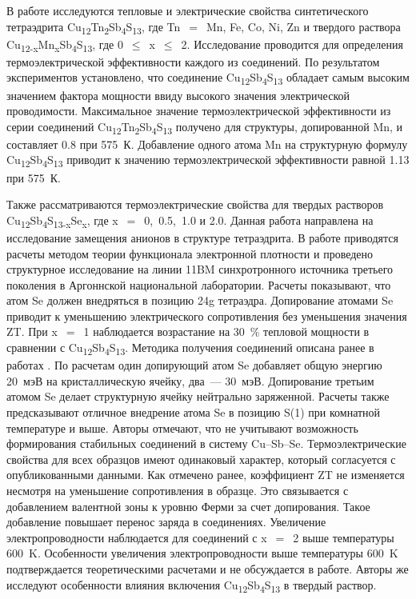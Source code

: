 В работе \cite{Heo2014} исследуются тепловые и электрические свойства синтетического тетраэдрита Cu\textsubscript{12}Tn\textsubscript{2}Sb\textsubscript{4}S\textsubscript{13}, где Tn~$=$~Mn, Fe, Co, Ni, Zn и твердого раствора Cu\textsubscript{12-x}Mn\textsubscript{x}Sb\textsubscript{4}S\textsubscript{13}, где 0~$\leq$~x~$\leq$~2. Исследование проводится для определения термоэлектрической эффективности каждого из соединений. По результатом экспериментов установлено, что соединение Cu\textsubscript{12}Sb\textsubscript{4}S\textsubscript{13} обладает самым высоким значением фактора мощности ввиду высокого значения электрической проводимости. Максимальное значение термоэлектрической эффективности из серии соединений Cu\textsubscript{12}Tn\textsubscript{2}Sb\textsubscript{4}S\textsubscript{13} получено для структуры, допированной Mn, и составляет 0.8 при 575~К. Добавление одного атома  Mn на структурную формулу Cu\textsubscript{12}Sb\textsubscript{4}S\textsubscript{13} приводит к значению термоэлектрической эффективности равной 1.13 при 575~К.

Также рассматриваются термоэлектрические свойства для твердых растворов Cu\textsubscript{12}Sb\textsubscript{4}S\textsubscript{13-x}Se\textsubscript{x}, где x~$=$~0,~0.5,~1.0 и 2.0\cite{Lu2016}.
Данная работа направлена на исследование замещения анионов в структуре тетраэдрита.
В работе приводятся расчеты методом теории функционала электронной плотности и проведено структурное исследование на линии 11BM  синхротронного источника третьего поколения в Аргоннской национальной лаборатории.
Расчеты показывают, что атом Se должен внедряться в позицию 24g тетраэдра.
Допирование атомами Se приводит к уменьшению электрического сопротивления без уменьшения значения ZT.
При x~$=$~1 наблюдается возрастание на 30~\% тепловой мощности в сравнении с Cu\textsubscript{12}Sb\textsubscript{4}S\textsubscript{13}.
Методика получения соединений описана ранее в работах \cite{Lu2013,Lu_2013b,Lu_2013}. По расчетам один допирующий атом Se  добавляет общую энергию 20~мэВ на кристаллическую ячейку, два~--- 30~мэВ.
Допирование третьим атомом Se делает структурную ячейку нейтрально заряженной. Расчеты также предсказывают отличное внедрение атома Se в позицию S(1) при комнатной температуре и выше. Авторы отмечают, что не учитывают возможность формирования стабильных соединений в систему Cu--Sb--Se.
Термоэлектрические свойства для всех образцов имеют одинаковый характер, который согласуется с опубликованными данными.
Как отмечено ранее, коэффициент ZT не изменяется несмотря на уменьшение сопротивления в образце.
Это связывается с добавлением  валентной зоны к уровню Ферми за счет допирования.
Такое добавление повышает перенос заряда в соединениях.
Увеличение электропроводности наблюдается для соединений с  x~$=$~2 выше температуры 600~K. Особенности увеличения электропроводности выше температуры 600~K подтверждается теоретическими расчетами и не обсуждается в работе.
Авторы же исследуют особенности влияния включения Cu\textsubscript{12}Sb\textsubscript{4}S\textsubscript{13} в твердый раствор.

